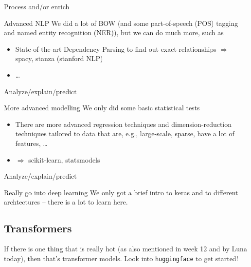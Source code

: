 \begin{frame}{Process and/or enrich}
	\begin{block}{Advanced NLP}
		We did a lot of BOW (and some part-of-speech (POS) tagging and named entity recognition (NER)), but we can do much more, such as 
		\begin{itemize}
			\item State-of-the-art Dependency Parsing to find out exact relationships
			$\Rightarrow$  spacy, stanza (stanford NLP)
                        \item \ldots
		\end{itemize}
	\end{block}
\end{frame}


 
\begin{frame}{Analyze/explain/predict}
	\begin{block}{More advanced modelling}
		We only did some basic statistical tests
		\begin{itemize}
			\item There are more advanced regression techniques and dimension-reduction techniques tailored to data that are, e.g., large-scale, sparse, have a lot of features, \ldots
			\item $\Rightarrow$ scikit-learn, statsmodels
		\end{itemize}
	\end{block}
\end{frame}


 
\begin{frame}{Analyze/explain/predict}
	\begin{block}{Really go into deep learning}
		We only got a brief intro to keras and to different archtectures -- there is a lot to learn here.
                \end{block}
\end{frame}






\subsection{Transformers}

\begin{frame}[standout]
If there is one thing that is really hot (as also mentioned in week 12 and by Luna today), then that's transformer models. Look into \texttt{huggingface} to get started!
\end{frame}

